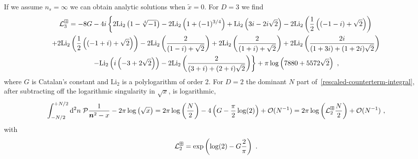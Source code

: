 If we assume $n_{s}=\infty$ we can obtain analytic solutions when $\tilde x=0$.  For $D=3$ we find
\begin{multline}
\mathcal{L}_3^{\boxplus}=-8 G-4 i \left\{2 \text{Li}_2\left(1-\sqrt[4]{-1}\right)-2 \text{Li}_2\left(1+(-1)^{3/4}\right)+\text{Li}_2\left(3 i-2 i
   \sqrt{2}\right)-2 \text{Li}_2\left(\frac{1}{2} \left((-1-i)+\sqrt{2}\right)\right)\right.\\
   \left.+2 \text{Li}_2\left(\frac{1}{2}
   \left((-1+i)+\sqrt{2}\right)\right)-2 \text{Li}_2\left(\frac{2}{(1-i)+\sqrt{2}}\right)+2
   \text{Li}_2\left(\frac{2}{(1+i)+\sqrt{2}}\right)+2 \text{Li}_2\left(\frac{2 i}{(1+3 i)+(1+2 i)
   \sqrt{2}}\right)\right.\\
   \left.-\text{Li}_2\left(i \left(-3+2 \sqrt{2}\right)\right)-2 \text{Li}_2\left(\frac{2}{(3+i)+(2+i)
   \sqrt{2}}\right)\right\}+\pi  \log \left(7880+5572 \sqrt{2}\right)\ ,
   \end{multline}
where $G$ is Catalan's constant and $\text{Li}_2$ is a polylogarithm of order 2.  For $D=2$ the dominant $N$ part of~\eqref{rescaled-counterterm-integral}, after subtracting off the logarithmic singularity in $\sqrt{x}$, is logarithmic,
\begin{equation}
 \int_{-N/2}^{+N/2} \mathrm{d}^2n\; \PV \frac{1}{\bm n^2 - x}-2\pi\log\left(\sqrt{x}\right)= 2\pi\log\left(\frac{N}{2}\right)-4\left(G-\frac{\pi }{2}\log(2)\right)+\mathcal{O}(N^{-1})=2\pi\log\left(\counterterm_2^{\dispersion}\frac{N}{2}\right)+\mathcal{O}(N^{-1})\ ,
\end{equation}
with
\begin{equation}
\counterterm_2^\dispersion=\exp\left(\log(2)-G\frac{2}{\pi}\right)\ .
\end{equation}
